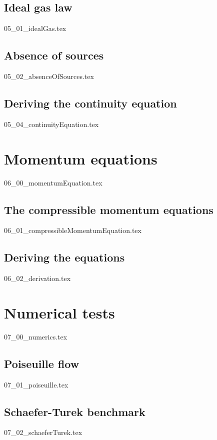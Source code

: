 \documentclass[12pt,a4paper,twoside]{article}
\begin{document}
\subsection{Ideal gas law}
\label{sub: Ideal gas law}
{05_01_idealGas.tex}

\subsection{Absence of sources}
\label{sub: Absence of sources}
{05_02_absenceOfSources.tex}

\subsection{Deriving the continuity equation}
\label{sub: Deriving the continuity equation}
{05_04_continuityEquation.tex}

\section{Momentum equations}
\label{sec: Momentum equations}
{06_00_momentumEquation.tex}

\subsection{The compressible momentum equations}
\label{sub: The compressible momentum equations}
{06_01_compressibleMomentumEquation.tex}

\subsection{Deriving the equations}
\label{sub: Deriving the equations}
{06_02_derivation.tex}

\section{Numerical tests}
\label{sec: Numerics}
{07_00_numerics.tex}

\subsection{Poiseuille flow}
\label{sub: Poiseuille flow}
{07_01_poiseuille.tex}

\subsection{Schaefer-Turek benchmark}
\label{sub: Schaefer-Turek benchmark}
{07_02_schaeferTurek.tex}
\end{document}
